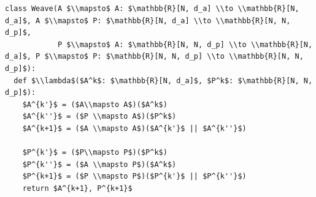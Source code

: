 \documentclass[border=10pt]{standalone}
\begin{document}
\begin{lstlisting}
class Weave(A $\\mapsto$ A: $\mathbb{R}[N, d_a] \\to \\mathbb{R}[N, d_a]$, A $\\mapsto$ P: $\mathbb{R}[N, d_a] \\to \\mathbb{R}[N, N, d_p]$, 
            P $\\mapsto$ A: $\mathbb{R}[N, N, d_p] \\to \\mathbb{R}[N, d_a]$, P $\\mapsto$ P: $\mathbb{R}[N, N, d_p] \\to \\mathbb{R}[N, N, d_p]$):
  def $\\lambda$($A^k$: $\mathbb{R}[N, d_a]$, $P^k$: $\mathbb{R}[N, N, d_p]$):
    $A^{k'}$ = ($A\\mapsto A$)($A^k$)
    $A^{k''}$ = ($P \\mapsto A$)($P^k$)
    $A^{k+1}$ = ($A \\mapsto A$)($A^{k'}$ || $A^{k''}$)
  
    $P^{k'}$ = ($P\\mapsto P$)($P^k$)
    $P^{k''}$ = ($A \\mapsto P$)($A^k$)
    $P^{k+1}$ = ($P \\mapsto P$)($P^{k'}$ || $P^{k''}$)
    return $A^{k+1}, P^{k+1}$
\end{lstlisting}
\end{document}
